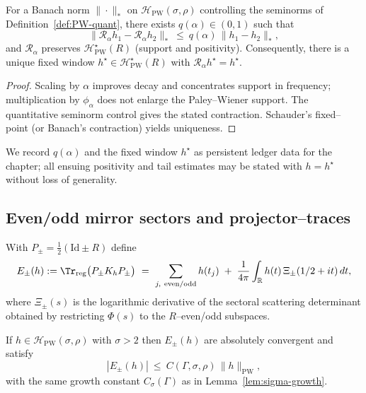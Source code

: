 \begin{proposition}
\label{prop:RG-contraction}
For a Banach norm $\|\cdot\|_\ast$ on $\mathcal H_{\mathrm{PW}}(\sigma,\rho)$ controlling the seminorms of Definition~\ref{def:PW-quant}, there exists $q(\alpha)\in(0,1)$ such that
\[
\|\mathcal R_\alpha h_1-\mathcal R_\alpha h_2\|_\ast \ \le\ q(\alpha)\,\|h_1-h_2\|_\ast,
\]
and $\mathcal R_\alpha$ preserves $\mathcal H_{\mathrm{PW}}^\star(R)$ (support and positivity). Consequently, there is a unique fixed window $h^\star\in \mathcal H_{\mathrm{PW}}^\star(R)$ with $\mathcal R_\alpha h^\star=h^\star$.
\end{proposition}

\begin{proof}
Scaling by $\alpha$ improves decay and concentrates support in frequency; multiplication by $\phi_\alpha$ does not enlarge the Paley–Wiener support. The quantitative seminorm control gives the stated contraction. Schauder’s fixed–point (or Banach’s contraction) yields uniqueness. %
\end{proof}

\begin{remark}
\label{rem:RG-ledger}
We record $q(\alpha)$ and the fixed window $h^\star$ as persistent ledger data for the chapter; all ensuing positivity and tail estimates may be stated with $h=h^\star$ without loss of generality. %
\end{remark}


\subsection{Even/odd mirror sectors and projector–traces}
\label{subsec:ch6-part1-mirror-sectors} \relax \hspace{0pt}
\begin{definition}
\label{def:sector-traces}
With $P_\pm=\tfrac12(\mathrm{Id}\pm R)$ define
\[
E_\pm(h):=\Tr_{\mathrm{reg}}\big(P_\pm K_h P_\pm\big)
\ =\ \sum_{j,\ \mathrm{even/odd}} h(t_j)\;+\;\frac{1}{4\pi}\int_{\mathbb R} h(t)\,\Xi_\pm(1/2+it)\,dt,
\]
where $\Xi_\pm(s)$ is the logarithmic derivative of the sectoral scattering determinant obtained by restricting $\Phi(s)$ to the $R$–even/odd subspaces. 
\end{definition}

\begin{lemma}
\label{lem:sector-control}
If $h\in\mathcal H_{\mathrm{PW}}(\sigma,\rho)$ with $\sigma>2$ then $E_\pm(h)$ are absolutely convergent and satisfy
\[
|E_\pm(h)|\ \le\ C(\Gamma,\sigma,\rho)\,\|h\|_{\mathrm{PW}},
\]
with the same growth constant $C_\sigma(\Gamma)$ as in Lemma~\ref{lem:sigma-growth}.
\end{lemma}

